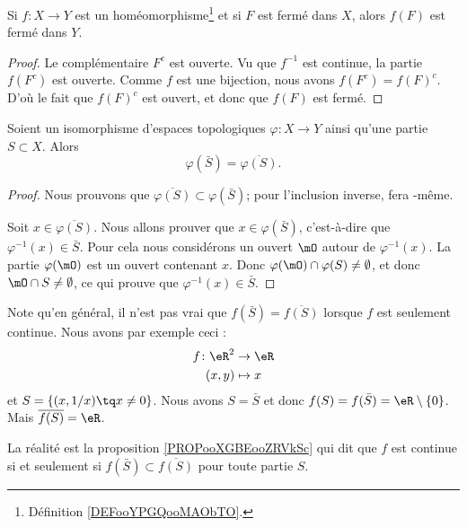 \begin{lemma}        \label{LEMooMJSHooOszteq}
	Si \( f\colon X\to Y\) est un homéomorphisme\footnote{Définition \ref{DEFooYPGQooMAObTO}.} et si \( F\) est fermé dans \( X\), alors \( f(F)\) est fermé dans \( Y\).
\end{lemma}

\begin{proof}
	Le complémentaire \( F^c\) est ouverte. Vu que \( f^{-1}\) est continue, la partie \( f(F^c)\) est ouverte. Comme \( f\) est une bijection, nous avons \( f(F^c)=f(F)^c\). D'où le fait que \( f(F)^c\) est ouvert, et donc que \( f(F)\) est fermé.
\end{proof}


\begin{lemma}		\label{LEMooNMPGooRlgppQ}
	Soient un isomorphisme d'espaces topologiques \(\varphi \colon X\to Y  \) ainsi qu'une partie \( S\subset X\). Alors
	\begin{equation}
		\varphi(\bar S)=\overline{\varphi(S)}.
	\end{equation}
\end{lemma}

\begin{proof}
	Nous prouvons que \( \overline{\varphi(S)}\subset\varphi(\bar S)\); pour l'inclusion inverse,  fera -même.

	Soit \( x\in\overline{\varphi(S)}\). Nous allons prouver que \( x\in\varphi(\bar S)\), c'est-à-dire que \( \varphi^{-1}(x)\in \bar S\). Pour cela nous considérons un ouvert \( \mO\) autour de \( \varphi^{-1}(x)\). La partie \( \varphi(\mO)\) est un ouvert contenant \( x\). Donc \( \varphi(\mO)\cap\varphi(S)\neq \emptyset\), et donc \( \mO\cap S\neq\emptyset\), ce qui prouve que \( \varphi^{-1}(x)\in\bar S\).
\end{proof}

\begin{normaltext}
	Note qu'en général, il n'est pas vrai que \( f(\bar S)=\overline{f(S)}\) lorsque \( f\) est seulement continue. Nous avons par exemple\cite{BIBooVVEUooPCYkeX} ceci :
	\begin{equation}
		\begin{aligned}
			f\colon \eR^2 & \to \eR   \\
			(x,y)         & \mapsto x
		\end{aligned}
	\end{equation}
	et \( S=\{ (x,1/x)\tq x\neq 0 \}\). Nous avons \( S=\bar S\) et donc \( f(S)=f(\bar S)=\eR\setminus\{ 0 \}\). Mais \( \overline{f(S)}=\eR\).

	La réalité est la proposition \ref{PROPooXGBEooZRVkSc} qui dit que \( f\) est continue si et seulement si \( f(\bar S)\subset \overline{f(S)}\) pour toute partie \( S\).
\end{normaltext}

